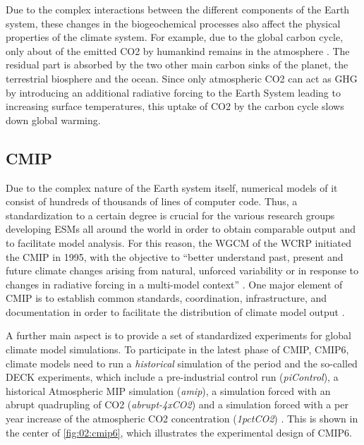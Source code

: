 Due to the complex interactions between the different components of the Earth
system, these changes in the biogeochemical processes also affect the physical
properties of the climate system. For example, due to the global carbon cycle,
only about  of the emitted \ac{CO2} by humankind remains in the
atmosphere \autocite{Friedlingstein2019}. The residual part is absorbed by the
two other main carbon sinks of the planet, the terrestrial biosphere and the
ocean. Since only atmospheric \ac{CO2} can act as \ac{GHG} by introducing an
additional radiative forcing to the Earth System leading to increasing surface
temperatures, this uptake of \ac{CO2} by the carbon cycle slows down global
warming.


\subsection{\acs{CMIP}}
\label{subsec:02:cmip}

Due to the complex nature of the Earth system itself, numerical models of it
consist of hundreds of thousands of lines of computer code. Thus, a
standardization to a certain degree is crucial for the various research groups
developing \acp{ESM} all around the world in order to obtain comparable output
and to facilitate model analysis. For this reason, the \ac{WGCM} of the
\ac{WCRP} initiated the \ac{CMIP} in 1995, with the objective to
\enquote{better understand past, present and future climate changes arising
  from natural, unforced variability or in response to changes in radiative
  forcing in a multi-model context} \autocite{WCRP2020}. One major element of
\ac{CMIP} is to establish common standards, coordination, infrastructure, and
documentation in order to facilitate the distribution of climate model output
\autocite{Eyring2016}.

A further main aspect is to provide a set of standardized experiments for
global climate model simulations. To participate in the latest phase of
\ac{CMIP}, \acs{CMIP}6, climate models need to run a \emph{historical}
simulation of the period  and the so-called \ac{DECK}
experiments, which include a pre-industrial control run (\emph{piControl}), a
historical Atmospheric \ac{MIP} simulation (\emph{amip}), a simulation forced
with an abrupt quadrupling of \ac{CO2} (\emph{abrupt-4xCO2}) and a simulation
forced with a  per year increase of the atmospheric \ac{CO2}
concentration (\emph{1pctCO2}) \autocite{Eyring2016}. This is shown in the
center of \cref{fig:02:cmip6}, which illustrates the experimental design of
\acs{CMIP}6.

